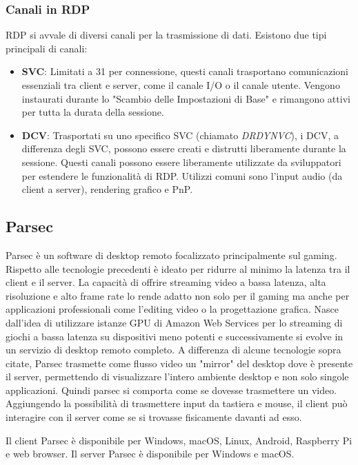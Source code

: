 \documentclass[12pt,a4paper,openright,twoside]{book}
\begin{document}
\subsubsection{Canali in RDP}
\ac{RDP} si avvale di diversi canali per la trasmissione di dati. Esistono due tipi principali di canali:
\begin{itemize}
    \item \textbf{\ac{SVC}}: Limitati a 31 per connessione,
    questi canali trasportano comunicazioni essenziali tra client e server, come il canale I/O o il canale utente. Vengono instaurati durante lo "Scambio delle Impostazioni di Base" e rimangono attivi per tutta la durata della sessione.
    \item \textbf{\ac{DCV}}: Trasportati su uno specifico \ac{SVC} (chiamato \emph{DRDYNVC}),
    i \ac{DCV}, a differenza degli \ac{SVC},
    possono essere creati e distrutti liberamente durante la sessione.
    Questi canali possono essere liberamente utilizzate da sviluppatori per estendere le funzionalità di \ac{RDP}.
    Utilizzi comuni sono l'input audio (da client a server), rendering grafico e PnP.
\end{itemize}

\subsection{Parsec}
\label{sec:parsec}
Parsec è un software di desktop remoto focalizzato principalmente sul gaming. Rispetto alle tecnologie precedenti è ideato per ridurre al minimo la latenza tra il client e il server.
La capacità di offrire streaming video a bassa latenza, alta risoluzione e alto frame rate lo rende adatto non solo per il gaming ma anche per applicazioni professionali come l'editing video o la progettazione grafica.
Nasce dall'idea di utilizzare istanze GPU di Amazon Web Services per lo streaming di giochi a bassa latenza su dispositivi meno potenti e successivamente si evolve in un servizio di desktop remoto completo.
%
A differenza di alcune tecnologie sopra citate,
Parsec trasmette come flusso video un "mirror" del desktop dove è presente il server,
permettendo di visualizzare l'intero ambiente desktop e non solo singole applicazioni. Quindi parsec si comporta come se dovesse trasmettere un video.
Aggiungendo la possibilità di trasmettere input da tastiera e mouse, il client può interagire con il server come se si trovasse fisicamente davanti ad esso.

Il client Parsec è disponibile per Windows, macOS, Linux, Android, Raspberry Pi e web browser. Il server Parsec è disponibile per Windows e macOS. 
\end{document}
